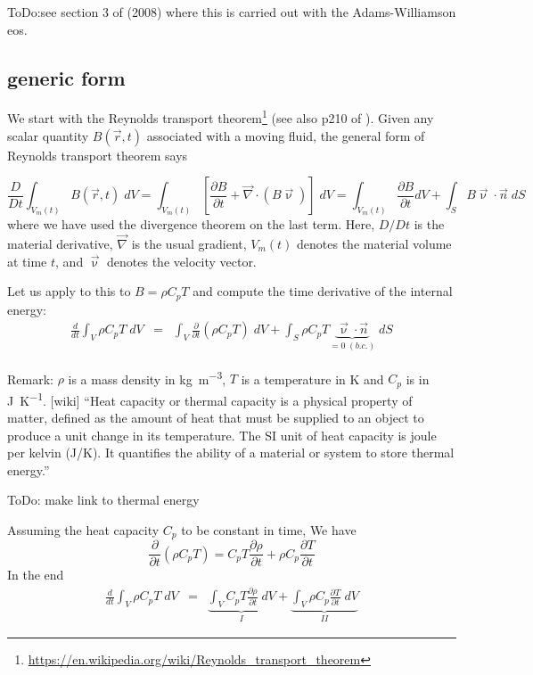 \documentclass[a4paper,11pt]{article}
\begin{document}
{\color{red} ToDo}:see section 3 of \cite{lezh08} (2008) 
where this is carried out with the Adams-Williamson eos.





\subsection{generic form}

We start with the Reynolds transport 
theorem\footnote{\url{https://en.wikipedia.org/wiki/Reynolds_transport_theorem}} 
(see also p210 of \cite{malvern}).
Given any scalar quantity $B(\vec{r},t)$ associated with a moving fluid, 
the general form of Reynolds transport theorem says 

\[
\frac{D}{Dt} \int_{V_m(t)} B(\vec{r},t) \; dV 
= \int_{V_m(t)} \left[ \frac{\partial B}{\partial t} + \vec\nabla \cdot( B \vec{\upnu})   \right]  \; dV 
=\int_{V_m(t)}  \frac{\partial B}{\partial t}  dV + \int_S B   \vec{\upnu} \cdot \vec{n} \; dS
\]
where we have used the divergence theorem on the last term.
Here, $D/Dt$ is the material derivative, $\vec\nabla$ 
is the usual gradient, $V_m(t)$ denotes the material volume at time $t$, 
and $\vec\upnu$ denotes the velocity vector.

Let us apply to this to $B=\rho C_p T$ and compute the time 
derivative of the internal energy:
\begin{eqnarray}
\frac{d}{dt} \int_V \rho C_p T \; dV 
&=& \int_V \frac{\partial }{\partial t} (\rho C_p T ) \; dV 
+ \int_S \rho C_p T  \underbrace{ \vec{\upnu}\cdot \vec{n}}_{=0 \; (b.c.)} \; dS 
\end{eqnarray}

Remark: $\rho$ is a mass density in \si{\kg\per\cubic\meter},
$T$ is a temperature in \si{\kelvin} and $C_p$ is in \si{\joule\per\kelvin}.
[wiki] ``Heat capacity or thermal capacity is a physical property of matter, defined as 
the amount of heat that must be supplied to an object to produce a unit change in its 
temperature. The SI unit of heat capacity is joule per kelvin (J/K). 
It quantifies the ability of a material or system to store thermal energy.''

{\color{red} ToDo: make link to thermal energy}

Assuming the heat capacity $C_p$ to be constant in time, We have 
\[
\frac{\partial }{\partial t} (\rho C_p T ) 
= C_p T \frac{\partial \rho}{\partial t} + \rho C_p \frac{\partial T}{\partial t} 
\]
In the end
\begin{eqnarray}
\frac{d}{dt} \int_V \rho C_p T \; dV 
&=& \underbrace{\int_V C_p T \frac{\partial \rho}{\partial t} \; dV}_{I} 
+ \underbrace{\int_V \rho C_p \frac{\partial T}{\partial t} \; dV }_{II}
\end{eqnarray}
\end{document}
